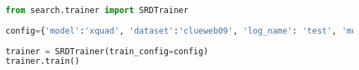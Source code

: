 \begin{lstlisting}[language=Python]
from search.trainer import SRDTrainer
   
config={'model':'xquad', 'dataset':'clueweb09', 'log_name': 'test', 'model_save_dir': "model/", 'tmp_dir': "tmp/", 'mode': "train",}
 
trainer = SRDTrainer(train_config=config)
trainer.train()
\end{lstlisting}



